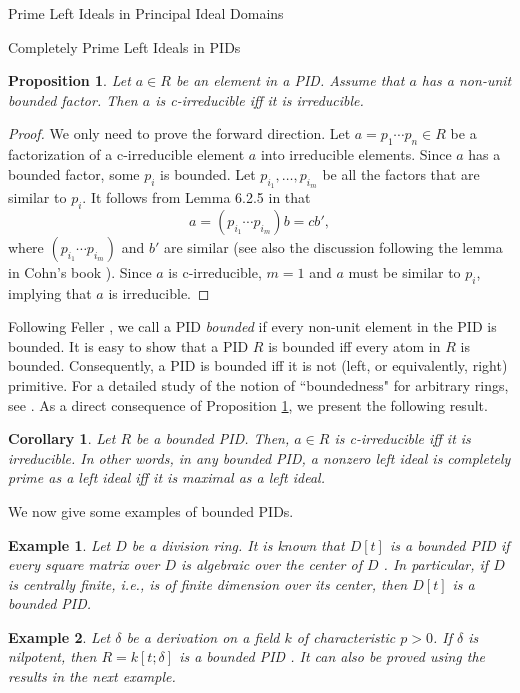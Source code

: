 \documentclass[11pt,a4paper]{article}
\theoremstyle{theorem}
\newtheorem{corollary}[theorem]{Corollary}
\newtheorem{proposition}[theorem]{Proposition}
\newtheorem{example}{Example}[section]
\numberwithin{equation}{section}
\begin{document}
\begin{section}{Prime Left Ideals in Principal Ideal Domains}
\begin{subsection}{Completely Prime Left Ideals in PIDs }
		\begin{proposition}\label{prop: completely prime with bounded factor}
			Let \(a\in R\) be an element in a PID. Assume that \(a\) has a non-unit bounded factor. Then \(a\) is c-irreducible iff it is irreducible.
		\end{proposition}
		\begin{proof}
			We only need to prove the forward direction. Let \(a = p_1\cdots p_n\in R\) be a factorization of a c-irreducible element \(a\) into irreducible elements. Since \(a\) has a bounded factor, some \(p_i\) is bounded. Let \(p_{i_1},\dots,p_{i_m}\) be all the factors that are similar to \(p_i\). It follows from Lemma 6.2.5 in  \cite[p. 344]{cohn2006free}  that 
			\[
				a = (p_{i_1}\cdots p_{i_m}) b = c b',
			\]
			where \((p_{i_1}\cdots p_{i_m})\) and \(b'\) are similar (see also the discussion following the lemma in Cohn's book \cite[p. 344]{cohn2006free}). Since \(a\) is c-irreducible, \(m=1\)  and \(a\) must be similar to \(p_i\), implying that \(a\) is irreducible.
		\end{proof} 
	Following Feller \cite{feller1961factorization}, we call a PID \textit{bounded} if every non-unit element in the PID is bounded. It is easy to show that a PID \(R\) is bounded iff every atom in \(R\) is bounded. Consequently, a PID is bounded iff it is not (left, or equivalently, right) primitive. For a  detailed study of the notion of ``boundedness" for arbitrary rings, see \cite[Chapter 1]{goodearl2004introduction}. As a direct consequence of Proposition \ref{prop: completely prime with bounded factor}, we present the following result. 
	\begin{corollary}\label{prop: bounded PID}
		Let \(R\) be a bounded PID. Then, \(a\in R\) is c-irreducible iff it is irreducible. In other words, in any bounded PID, a nonzero left ideal is completely prime as a left ideal iff it is maximal as a left ideal.
	\end{corollary}
		 We now give some examples of bounded PIDs.   
		\begin{example}
			Let \(D\) be a division ring. It is known that  \(D[t]\) is a bounded PID if every square matrix over \(D\) is algebraic over the center of \(D\) \cite[Theorem 17.2.]{goodearl2004introduction}. In particular, if \(D\) is centrally finite, i.e., is of finite dimension over its center, then \(D[t]\) is a bounded PID. 
		\end{example} 
		\begin{example}
			Let \(\delta\) be a derivation on a field \(k\) of characteristic \(p>0\). If \(\delta\) is nilpotent, then \(R = k[t;\delta]\) is a bounded PID \cite[Exercise 9D]{goodearl2004introduction}. It can also be proved using the results in the next example.   

\end{example}
\end{subsection}
\end{section}
\end{document}
